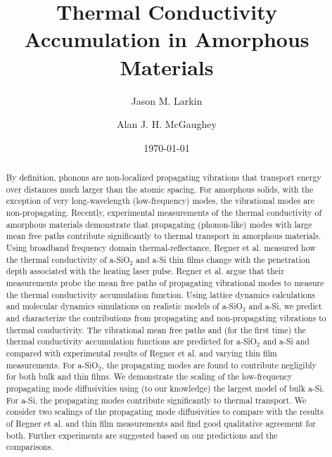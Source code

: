 \documentclass[aps,prb,onecolumn,preprint,superscriptaddress,footinbib,amsmath,amssymb,floatfix]{revtex4}
\begin{document}
\title{Thermal Conductivity Accumulation in Amorphous Materials}
\author{Jason M. Larkin}
\author{Alan J. H. McGaughey}
\date{\today}
\begin{abstract}

By definition, phonons are non-localized propagating vibrations that 
transport energy over distances much larger than the atomic spacing. For 
amorphous solids, with the 
exception 
of very long-wavelength (low-frequency) modes, the vibrational modes are 
non-propagating. 
Recently, 
experimental measurements of the thermal conductivity of amorphous 
materials demonstrate that 
propagating (phonon-like) modes with large mean free paths 
contribute significantly to thermal transport in amorphous 
materials.\cite{regner_broadband_2013,sultan_heat_2013} 
Using broadband frequency domain thermal-reflectance, 
Regner et al. measured how the thermal conductivity of a-SiO$_2$ and 
a-Si thin films change with the penetration depth associated with the 
heating laser pulse.\cite{regner_broadband_2013} 
Regner et al. argue that their measurements probe the mean free 
paths of propagating vibrational modes to measure the 
thermal conductivity accumulation function.    
Using lattice dynamics calculations and molecular dynamics simulations 
on 
realistic models of a-SiO$_2$ and a-Si, we predict and 
characterize the contributions from propagating and non-propagating 
vibrations 
to thermal conductivity. The vibrational mean free paths 
and (for the first time) the thermal 
conductivity accumulation functions are predicted for a-SiO$_2$ and a-Si 
and compared with experimental results of 
Regner et al. and varying thin film measurements. 
For a-SiO$_2$, the propagating modes are found to contribute 
negligibly for both bulk and thin films. We demonstrate the scaling 
of the low-frequency propagating mode diffusivities using 
(to our knowledge) the largest model of bulk a-Si.   
For a-Si, the propagating modes contribute significantly to thermal 
transport. We consider two scalings of the propagating mode 
diffusivities to compare with the results of Regner et al. and thin 
film measurements and find 
good qualitative agreement for both. Further 
experiments are suggested based on our predictions and the comparisons. 
\end{abstract}
\maketitle
\end{document}
